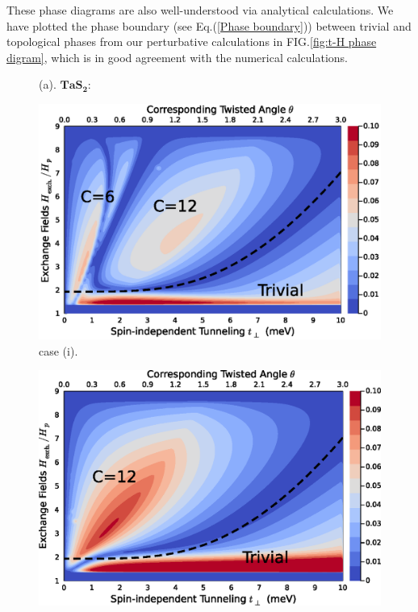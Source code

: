 These phase diagrams are also well-understood via analytical calculations. We have plotted the phase boundary (see Eq.(\ref{Phase boundary})) between trivial and topological phases from our perturbative calculations in FIG.\ref{fig:t-H phase digram}, which is in good agreement with the numerical calculations.
\begin{figure}[!htp]
    \centering
    \begin{minipage}{1.0\textwidth}
        \RaggedRight (a). $\mathbf{TaS_2:}$\\[0.5em]
        \begin{minipage}{0.45\textwidth}
            \centering
            \includegraphics[width=\linewidth]{contents/Ising_Top/figures/Gap_Size_Phase_Diagram.TaS2.t_H.magnetic_with_prediction.eps}\\
            case (i).
        \end{minipage}
        \hspace{1em}
        \begin{minipage}{0.45\textwidth}
            \centering
            \includegraphics[width=\linewidth]{contents/Ising_Top/figures/Gap_Size_Phase_Diagram.TaS2.t_H.non-magnetic_with_prediction.eps}\\

\end{minipage}
\end{minipage}
\end{figure}
